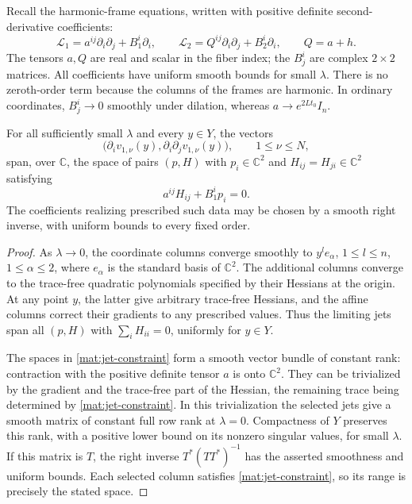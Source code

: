 Recall the harmonic-frame equations, written with positive definite
second-derivative coefficients:
\begin{equation}
 \mathcal L_1=a^{ij}\partial_i\partial_j+B_1^i\partial_i,
 \qquad
 \mathcal L_2=Q^{ij}\partial_i\partial_j+B_2^i\partial_i,
 \qquad Q=a+h.
 \label{mat:operators}
\end{equation}
The tensors $a,Q$ are real and scalar in the fiber index; the $B_j^i$
are complex $2\times2$ matrices.  All coefficients have uniform smooth
bounds for small $\lambda$.  There is no zeroth-order term because the
columns of the frames are harmonic.  In ordinary coordinates,
$B_j^i\longrightarrow0$ smoothly under dilation, whereas
$a\longrightarrow e^{2Lt_0}I_n$.

\begin{lemma}
\label{mat:spanning}
For all sufficiently small $\lambda$ and every $y\in Y$, the vectors
\[
 \big(\partial_i v_{1,\nu}(y),
             \partial_i\partial_j v_{1,\nu}(y)\big),
 \qquad 1\le\nu\le N,
\]
span, over $\mathbb C$, the space of pairs $(p,H)$ with
$p_i\in\mathbb C^2$ and
$H_{ij}=H_{ji}\in\mathbb C^2$ satisfying
\begin{equation}
             a^{ij}H_{ij}+B_1^ip_i=0.
 \label{mat:jet-constraint}
\end{equation}
The coefficients realizing prescribed such data may be chosen by a
smooth right inverse, with uniform bounds to every fixed order.
\end{lemma}

\begin{proof}
As $\lambda\to0$, the coordinate columns converge smoothly to
$y^l e_\alpha$, $1\le l\le n$, $1\le\alpha\le2$, where
$e_\alpha$ is the standard basis of $\mathbb C^2$.  The additional
columns converge to the trace-free quadratic polynomials specified by
their Hessians at the origin.  At any point $y$, the latter give
arbitrary trace-free Hessians, and the affine columns correct their
gradients to any prescribed values.  Thus the limiting jets span all
$(p,H)$ with $\sum_iH_{ii}=0$, uniformly for $y\in Y$.

The spaces in \eqref{mat:jet-constraint} form a smooth vector bundle of
constant rank: contraction with the positive definite tensor $a$ is
onto $\mathbb C^2$.  They can be trivialized by the gradient and the
trace-free part of the Hessian, the remaining trace being determined
by \eqref{mat:jet-constraint}.  In this trivialization the selected jets
give a smooth matrix of constant full row rank at $\lambda=0$.
Compactness of $Y$ preserves this rank, with a positive lower bound on
its nonzero singular values, for small $\lambda$.  If this matrix is
$T$, the right inverse $T^*(TT^*)^{-1}$ has the asserted smoothness and
uniform bounds.  Each selected column satisfies
\eqref{mat:jet-constraint}, so its range is precisely the stated space.
\end{proof}

